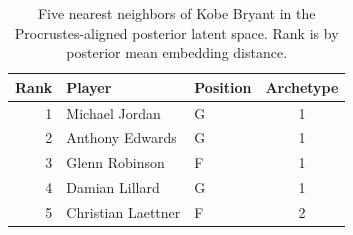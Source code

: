 \begin{table}[htbp]
  \centering\small
  \begin{tabular}{rllc}
    \toprule
    Rank & Player & Position & Archetype \\
    \midrule
    1 & Michael Jordan & G & 1 \\
    2 & Anthony Edwards & G & 1 \\
    3 & Glenn Robinson & F & 1 \\
    4 & Damian Lillard & G & 1 \\
    5 & Christian Laettner & F & 2 \\
    \bottomrule
  \end{tabular}
  \caption{Five nearest neighbors of Kobe Bryant in the Procrustes-aligned posterior latent space. Rank is by posterior mean embedding distance.}
  \label{tab:Kobe_Bryant_neighbors}
\end{table}


